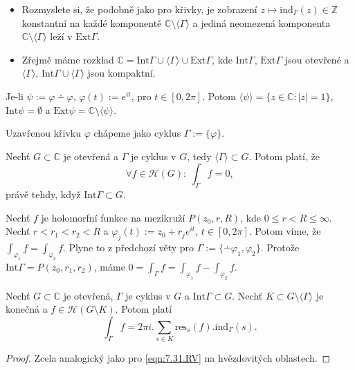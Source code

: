 \begin{note}
\begin{itemize}
    \item Rozmyslete si, že podobně jako pro křivky, je zobrazení $z\mapsto\text{ind}_\Gamma(z)\in\mathbb{Z}$ konstantní na každé komponentě $\mathbb{C}\setminus\langle\Gamma\rangle$ a jediná neomezená komponenta $\mathbb{C}\setminus\langle\Gamma\rangle$ leží v $\text{Ext}\Gamma$.
    \item Zřejmě máme rozklad $\mathbb{C}=\text{Int}\Gamma\cup\langle\Gamma\rangle\cup\text{Ext} \Gamma$, kde $\text{Int} \Gamma$, $\text{Ext} \Gamma$ jsou otevřené a $\langle\Gamma\rangle$, $\text{Int} \Gamma\cup\langle\Gamma\rangle$ jsou kompaktní.
\end{itemize}
\end{note}

\begin{example}
Je-li $\psi:=\varphi\dotminus\varphi$, $\varphi(t):=e^{it}$, pro $t\in[0,2\pi]$. Potom $\langle\psi\rangle=\{z\in\mathbb{C}: |z|=1\}$, $\text{Int}\psi=\emptyset$ a $\text{Ext}\psi=\mathbb{C}\setminus\langle\psi\rangle$.
\end{example}

\begin{note}
Uzavřenou křivku $\varphi$ chápeme jako cyklus $\Gamma:=\{\varphi\}$.
\end{note}

\begin{theorem}
Nechť $G\subset\mathbb{C}$ je otevřená a $\Gamma$ je cyklus v $G$, tedy $\langle\Gamma\rangle\subset G$. Potom platí, že
\begin{equation}
    \forall f\in\mathcal{H}(G):\ \int_\Gamma f =0,
    \tag{CV}
    \label{eqn:7.30.cv}
\end{equation}
právě tehdy, když $\text{Int}\Gamma\subset G$.
\end{theorem}

\begin{example}
Nechť $f$ je holomorfní funkce na mezikruží $P(z_0,r,R)$, kde $0\leq r<R\leq\infty$. Nechť $r<r_1<r_2<R$ a $\varphi_j(t):=z_0+r_je^{it}$, $t\in[0,2\pi]$. Potom víme, že $\int_{\varphi_1}f=\int_{\varphi_2}f$. Plyne to z předchozí věty pro $\Gamma:=\{\dotminus\varphi_1,\varphi_2\}$. Protože $\text{Int}\Gamma=P(z_0,r_1,r_2)$, máme $0=\int_\Gamma f = \int_{\varphi_1}f-\int_{\varphi_2}f$.
\end{example}

\begin{theorem}
Nechť $G\subset\mathbb{C}$ je otevřená, $\Gamma$ je cyklus v $G$ a $\text{Int}\Gamma\subset G$. Nechť $K\subset G\setminus\langle\Gamma\rangle$ je konečná  a $f\in\mathcal{H}(G\setminus K)$. Potom platí
\begin{equation}
    \int_\Gamma f = 2\pi i . \sum_{s\in K}\text{res}_s(f).\text{ind}_\Gamma(s).
    \tag{RVC}
    \label{eqn:9.8.rvc}
\end{equation}
\end{theorem}
\begin{proof}
Zcela analogický jako pro \cref{eqn:7.31.RV} na hvězdovitých oblastech.
\end{proof}
